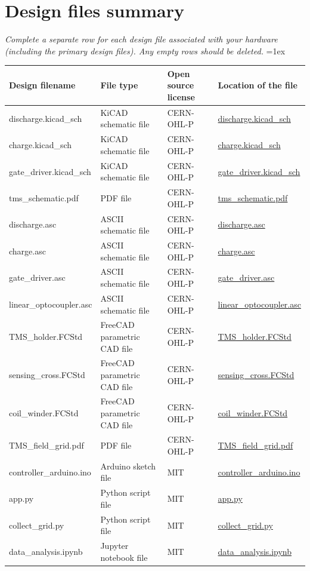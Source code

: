 \documentclass[11pt, letterpaper]{article}
\begin{document}
\section{Design files summary}
\textit{Complete a separate row for each design file associated with your hardware (including the primary design files). Any empty rows should be deleted.}
\vskip 0.1cm
\tabulinesep=1ex
\begin{tabu} to \linewidth {|X|X[1.3,1]|X|X|} 
\hline
\textbf{Design filename} & \textbf{File type} & \textbf{Open source license} & \textbf{Location of the file} \\\hline
discharge.kicad\_sch & KiCAD schematic file & CERN-OHL-P & \href{TODO}{discharge.kicad\_sch} \\
charge.kicad\_sch & KiCAD schematic file & CERN-OHL-P & \href{TODO}{charge.kicad\_sch} \\
gate\_driver.kicad\_sch & KiCAD schematic file & CERN-OHL-P & \href{TODO}{gate\_driver.kicad\_sch} \\
tms\_schematic.pdf & PDF file & CERN-OHL-P & \href{TODO}{tms\_schematic.pdf} \\\hline

discharge.asc & ASCII schematic file & CERN-OHL-P & \href{TODO}{discharge.asc} \\
charge.asc & ASCII schematic file & CERN-OHL-P & \href{TODO}{charge.asc} \\
gate\_driver.asc & ASCII schematic file & CERN-OHL-P & \href{TODO}{gate\_driver.asc} \\
linear\_optocoupler.asc & ASCII schematic file & CERN-OHL-P & \href{TODO}{linear\_optocoupler.asc} \\\hline

TMS\_holder.FCStd & FreeCAD parametric CAD file & CERN-OHL-P & \href{TODO}{TMS\_holder.FCStd} \\
sensing\_cross.FCStd & FreeCAD parametric CAD file & CERN-OHL-P & \href{TODO}{sensing\_cross.FCStd} \\
coil\_winder.FCStd & FreeCAD parametric CAD file & CERN-OHL-P & \href{TODO}{coil\_winder.FCStd} \\
TMS\_field\_grid.pdf & PDF file & CERN-OHL-P & \href{TODO}{TMS\_field\_grid.pdf} \\\hline

controller\_arduino.ino & Arduino sketch file & MIT & \href{TODO}{controller\_arduino.ino} \\
app.py & Python script file & MIT & \href{TODO}{app.py} \\\hline

collect\_grid.py & Python script file & MIT & \href{TODO}{collect\_grid.py} \\
data\_analysis.ipynb & Jupyter notebook file & MIT & \href{TODO}{data\_analysis.ipynb} \\\hline

\end{tabu}
\end{document}
